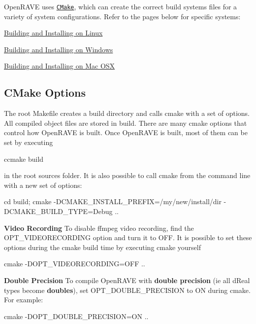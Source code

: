 OpenRAVE uses \href{http://www.cmake.org/}{\tt CMake}, which can create the correct build systems files for a variety of system configurations. Refer to the pages below for specific systems:


\begin{DoxyItemize}
\item \hyperlink{installation__linux}{Building and Installing on Linux}
\item \hyperlink{installation__windows}{Building and Installing on Windows}
\item \hyperlink{installation__macosx}{Building and Installing on Mac OSX}
\end{DoxyItemize}\hypertarget{installation_installation_cmake}{}\subsection{CMake Options}\label{installation_installation_cmake}
The root Makefile creates a {\ttfamily build} directory and calls cmake with a set of options. All compiled object files are stored in {\ttfamily build}. There are many cmake options that control how OpenRAVE is built. Once OpenRAVE is built, most of them can be set by executing

\begin{DoxyVerb}
ccmake build
\end{DoxyVerb}


in the root sources folder. It is also possible to call cmake from the command line with a new set of options:

\begin{DoxyVerb}
cd build; cmake -DCMAKE_INSTALL_PREFIX=/my/new/install/dir -DCMAKE_BUILD_TYPE=Debug ..
\end{DoxyVerb}



\begin{DoxyItemize}
\item {\bfseries Video Recording} To disable ffmpeg video recording, find the {\ttfamily OPT\_\-VIDEORECORDING} option and turn it to {\ttfamily OFF}. It is possible to set these options during the cmake build time by executing cmake yourself \begin{DoxyVerb}
cmake -DOPT_VIDEORECORDING=OFF ..
\end{DoxyVerb}

\end{DoxyItemize}


\begin{DoxyItemize}
\item {\bfseries Double Precision} To compile OpenRAVE with {\bfseries double precision} (ie all dReal types become {\bfseries doubles}), set {\ttfamily OPT\_\-DOUBLE\_\-PRECISION} to {\ttfamily ON} during cmake. For example: \begin{DoxyVerb}
cmake -DOPT_DOUBLE_PRECISION=ON ..
\end{DoxyVerb}

\end{DoxyItemize}



